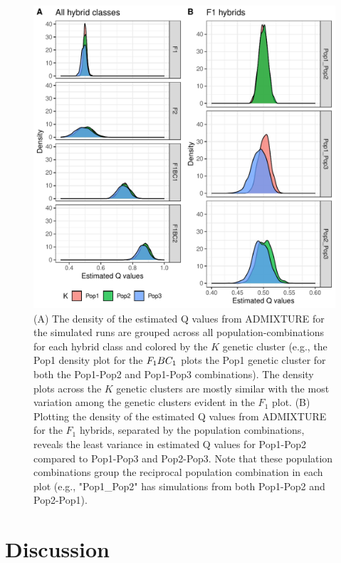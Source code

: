 {%
\begin{figure}
\newcommand{\pigsimsqscap}{\footnotesize (A) The density of the estimated Q values from ADMIXTURE for
the simulated runs are
grouped across all population-combinations for each hybrid class and colored by the $K$ genetic cluster
(e.g., the Pop1 density plot for the $F_{1}\BC_1$ plots the Pop1 genetic cluster for both
the Pop1-Pop2 and Pop1-Pop3 combinations). The density plots across the $K$
genetic clusters are mostly similar with the most variation among the genetic clusters evident in
the $F_1$ plot. (B) Plotting the density of the estimated Q values from ADMIXTURE for the $F_1$ hybrids,
separated by the population combinations, reveals the least variance in estimated Q values for
Pop1-Pop2 compared to Pop1-Pop3 and Pop2-Pop3. Note that these population combinations group the
reciprocal population combination in each plot (e.g., "Pop1\_Pop2" has simulations
from both Pop1-Pop2 and Pop2-Pop1).}
\includegraphics[width=\columnwidth]{figures/simulation-density-multipanel.pdf}
\caption[\pigsimsqscap]{\pigsimsqscap}
\label{fig:pig-sim-qs}
\end{figure}

\section*{Discussion}

}
